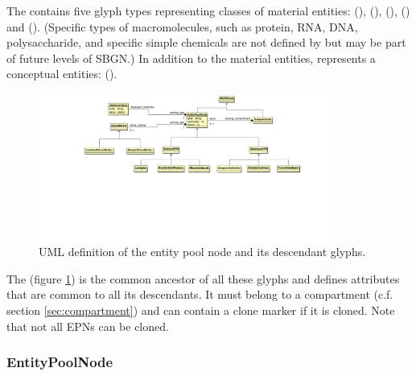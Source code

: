 The \PD contains five glyph types representing classes of material
entities:  (),
 (), 
(),  ()
and  ().  (Specific types of
macromolecules, such as protein, RNA, DNA, polysaccharide, and
specific simple chemicals are not defined by \PD but may be part of
future levels of SBGN.)  In addition to the material entities, \PD
represents a conceptual entities:  ().

\begin{figure}[htb]
  \centering
  \includegraphics[width=0.85\textwidth]{images/epnuml}
\caption{UML definition of the entity pool node and its descendant glyphs.}
  \label{fig:epnuml}
\end{figure}
 
The  (figure \ref{fig:epnuml}) is the common
ancestor of all these glyphs and defines attributes that are common to
all its descendants. It must belong to a compartment (c.f.\, section
\ref{sec:compartment})  and can contain a clone marker if it is
cloned. Note that not all EPNs can be cloned.


\subsubsection{EntityPoolNode}

